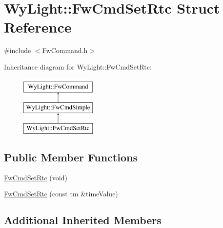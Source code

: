 \hypertarget{struct_wy_light_1_1_fw_cmd_set_rtc}{\section{Wy\-Light\-:\-:Fw\-Cmd\-Set\-Rtc Struct Reference}
\label{struct_wy_light_1_1_fw_cmd_set_rtc}
}


{\ttfamily \#include $<$Fw\-Command.\-h$>$}

Inheritance diagram for Wy\-Light\-:\-:Fw\-Cmd\-Set\-Rtc\-:\begin{figure}[H]
\begin{center}
\leavevmode
\includegraphics[height=3.000000cm]{struct_wy_light_1_1_fw_cmd_set_rtc}
\end{center}
\end{figure}
\subsection*{Public Member Functions}
\begin{DoxyCompactItemize}
\item 
\hyperlink{struct_wy_light_1_1_fw_cmd_set_rtc_afdf9d32595b1eb9d5bf27a06fd02545a}{Fw\-Cmd\-Set\-Rtc} (void)
\item 
\hyperlink{struct_wy_light_1_1_fw_cmd_set_rtc_a791e1c7e9cf3ca8c53e236599e890f41}{Fw\-Cmd\-Set\-Rtc} (const tm \&time\-Value)
\end{DoxyCompactItemize}
\subsection*{Additional Inherited Members}


